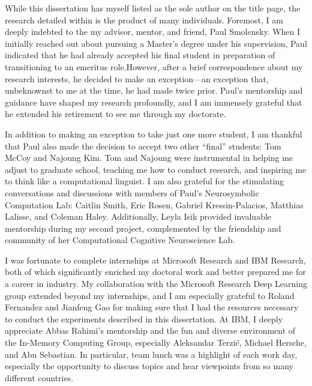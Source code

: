 
While this dissertation has myself listed as the sole author on the title page, the research detailed within is the product of many individuals. Foremost, I am deeply indebted to the my advisor, mentor, and friend, Paul Smolensky. When I initially reached out about pursuing a Master's degree under his supervision, Paul indicated that he had already accepted his final student in preparation of transitioning to an emeritus role.However, after a brief correspondence about my research interests, he decided to make an exception—an exception that, unbeknownst to me at the time, he had made twice prior. Paul's mentorship and guidance have shaped my research profoundly, and I am immensely grateful that he extended his retirement to see me through my doctorate.

In addition to making an exception to take just one more student, I am thankful that Paul also made the decision to accept two other ``final'' students: Tom McCoy and Najoung Kim. Tom and Najoung were instrumental in helping me adjust to graduate school, teaching me how to conduct research, and inspiring me to think like a computational linguist. I am also grateful for the stimulating conversations and discussions with members of Paul's Neurosymbolic Computation Lab: Caitlin Smith, Eric Rosen, Gabriel Kressin-Palacios, Matthias Lalisse, and Coleman Haley. Additionally, Leyla Isik provided invaluable mentorship during my second project, complemented by the friendship and community of her Computational Cognitive Neuroscience Lab.

I was fortunate to complete internships at Microsoft Research and IBM Research, both of which significantly enriched my doctoral work and better prepared me for a career in industry. My collaboration with the Microsoft Research Deep Learning group extended beyond my internships, and I am especially grateful to Roland Fernandez and Jianfeng Gao for making sure that I had the resources necessary to conduct the experiments described in this dissertation. At IBM, I deeply appreciate Abbas Rahimi’s mentorship and the fun and diverse environment of the In-Memory Computing Group, especially Aleksandar Terzić, Michael Hersche, and Abu Sebastian. In particular, team lunch was a highlight of each work day, especially the opportunity to discuss topics and hear viewpoints from so many different countries.

